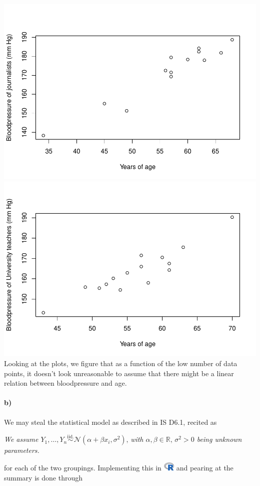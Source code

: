 \documentclass[
]{article}
\newenvironment{Shaded}{\begin{snugshade}}{\end{snugshade}}
\newcommand{\KeywordTok}[1]{\textcolor[rgb]{0.13,0.29,0.53}{\textbf{#1}}}
\newcommand{\NormalTok}[1]{#1}
\newcommand{\OperatorTok}[1]{\textcolor[rgb]{0.81,0.36,0.00}{\textbf{#1}}}
\newcommand{\StringTok}[1]{\textcolor[rgb]{0.31,0.60,0.02}{#1}}
\begin{document}
\includegraphics[width=0.5\linewidth]{matstatproblems20-21_files/figure-latex/unnamed-chunk-118-1}
\includegraphics[width=0.5\linewidth]{matstatproblems20-21_files/figure-latex/unnamed-chunk-118-2}
Looking at the plots, we figure that as a function of the low number of
data points, it doesn't look unreasonable to assume that there might be
a linear relation between bloodpressure and age.

\hypertarget{b-1}{%
\paragraph{\texorpdfstring{\textbf{b)}}{b)}}\label{b-1}}

We may steal the statistical model as described in IS D6.1, recited as

\emph{We assume
\(Y_1,\ldots,Y_n \overset{\text{iid.}}{\sim}\mathcal{N}(\alpha+\beta x_i,\sigma^2),\,\)with
\(\alpha,\beta\in\mathbb{R},\,\sigma^2>0\) being unknown parameters.}

for each of the two groupings. Implementing this in
\includegraphics[width=\textwidth,height=0.16667in]{R_logo.png} and
pearing at the summary is done through

\begin{Shaded}
\end{Shaded}
\end{document}
